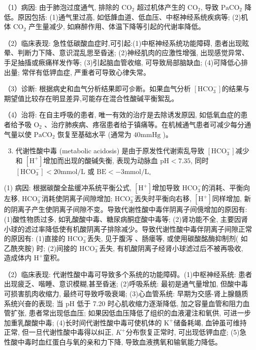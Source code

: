 \documentclass[10pt]{article}
\begin{document}
（1）病因: 由于肺泡过度通气, 排除的 $\mathrm{CO}_{2}$ 超过机体产生的 $\mathrm{CO}_{2}$, 导致 $\mathrm{PaCO}_{2}$ 降低。原因包括: (1)通气里过高, 如低韸血道、低血压、中枢神经系统疾病等; (2)机体 $\mathrm{CO}_{2}$ 产生量减少, 如麻醉作用、体温下降等引起的代谢率降低。

（2）临床表现: 急性低碳酸血症时,可引起:(1)中枢神经系统功能障碍, 患者出现眩晕、判断力下降、意识混乱思至昏迷; (2)神经肌肉的应激性增强, 出现感觉异常、手足抽搐或瘚痛样发作等; (3)引起脑血管收缩, 可导致局部脑缺血; (4)可降低心排出量; 常伴有低钾血症, 严重者可导致心律失常。

（3）诊断: 根据病史和血气分析结果即可㐱断。如果血气分析 $\left[\mathrm{HCO}_{3}^{-}\right]$的结果与期望值比较存在明显差异,可能存在混合性酸碱平衡絮乱。

（4）治将: 在自主呼吸的患者, 唯一有效的治疗是去除诱发原因, 如低氧血症的患者给予吸 $\mathrm{O}_{2}$ 、治疗肺疾病、疼宿患者给于镇痛等。在机械通气患者可减少每分通气量以使 $\mathrm{PaCO}_{2}$ 恢复至基础水平 (通常为 $40 \mathrm{mmHg}$ )。

\begin{enumerate}
  \setcounter{enumi}{2}
  \item 代谢性酸中毒 (metabolic acidosis) 是由于原发性代谢索乱导致 $\left[\mathrm{HCO}_{3}^{-}\right]$减少和 $\left[\mathrm{H}^{+}\right]$增加而出现的酸碱失衡, 表现为动脉血 $\mathrm{pH}<7.35$, 同时 $\left[\mathrm{HCO}_{3}^{-}\right]<20 \mathrm{mmol} / \mathrm{L}$ 或 $\mathrm{BE}<-3 \mathrm{mmol} / \mathrm{L}_{\circ}$
\end{enumerate}

(1) 病因: 根据碳酸全盐缓冲系统平衡公式, $\left[\mathrm{H}^{+}\right]$增加导致 $\mathrm{HCO}_{3}^{-}$的消耗、平衡向左移, $\mathrm{HCO}_{3}^{-}$消耗使阴离子间隙增加; $\mathrm{HCO}_{3}^{-}$丟失时平衡向右移, $\left[\mathrm{H}^{+}\right]$同样增加, 新的阴离子产生使阴离子间隙不变。导致代谢性酸中毒伴阴离子间傹增加的原因有: (1)酸性物质过多, 如乳酸酸中毒、糖尿病酮症酸中毒等; (2)肾功能不全, 主要因肾小球的滤过率降低使有机酸阴离子排除减少。导致代谢性酸中毒伴阴离子间隙正常的原因有: (1)直接的 $\mathrm{HCO}_{3}^{-}$丢失, 见于腹泻 、肠瘘等, 或使用碳酸酩酶抑制剂( 如乙酰夾胺) 时; (2)间接的 $\mathrm{HCO}_{3}^{-}$丢失, 有机酸阴离子经肾小球滤过后不被再吸收, 造成体内 $\mathrm{H}^{+}$童积。

（2）临床表现: 代谢性酸中毒可导致多个系统的功能障碍。(1)中枢神经系统: 患者出现疲乏、喈睡、意识模糊,甚至昏迷; (2)呼吸系统: 最初是通气量增加, 但酸中毒可损害肌肉收缩力, 最终可导致呼吸衰竭; (3)心血管系统: 早期为交感-肾上腺髓质系统兴奋的表现; 当 $\mathrm{pH}$ 低于 7.20 时心肌收缩力逐渐降低, 加之容量血管和阻力血管扩张, 患者常出现低血压; 如果因低血压降低了组织的血液灌注和氧供, 可进一步加重乳酸酸中毒; (4)长时间代谢性酸中毒可使机体的 $\mathrm{K}^{+}$储备耗竭, 血钟虽可维持正常, 但一旦代谢性酸中毒得以纠正, $K^{+}$分布恢复正常时, 可出现低钾血症; (5)急性酸中毒时血红蛋白与氧的亲和力下降, 导致血液携氧和输氧能力降低。
\end{document}

